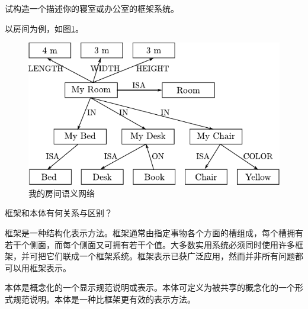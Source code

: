 \begin{question}
试构造一个描述你的寝室或办公室的框架系统。
\end{question}
\begin{solution}
以房间为例，如图\ref{Fig:semantic-my-room}。
	\begin{figure}[h]
		\centering
		\includegraphics[scale=.9]{figures/ans-2.9.pdf}
		\caption{ 我的房间语义网络 } \label{Fig:semantic-my-room}
	\end{figure}
\end{solution}

\begin{question}
框架和本体有何关系与区别？
\end{question}
\begin{solution}
框架是一种结构化表示方法。框架通常由指定事物各个方面的槽组成，每个槽拥有若干个侧面，而每个侧面又可拥有若干个值。大多数实用系统必须同时使用许多框架，并可把它们联成一个框架系统。框架表示已获广泛应用，然而并非所有问题都可以用框架表示。\par
本体是概念化的一个显示规范说明或表示。本体可定义为被共享的概念化的一个形式规范说明。本体是一种比框架更有效的表示方法。
\end{solution}